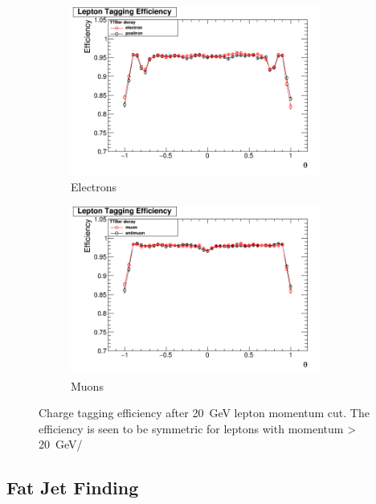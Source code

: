 \begin{figure}
  \centering
  \begin{subfigure}{.5\textwidth}
    \centering
    \includegraphics[width=0.9\textwidth]{TopAnalysis/figures/ElectronEfficiencys_20GeVCut.png}
    \caption[Charge Tagging Efficiency]{Electrons}
  \end{subfigure}%
  \begin{subfigure}{.5\textwidth}
    \centering
    \includegraphics[width=0.9\textwidth]{TopAnalysis/figures/MuonEfficiencys_20GeVMCCut.png}
    \caption[Charge Tagging Efficiency]{Muons}
  \end{subfigure}
  \caption[Charge Tagging Efficiency After 20GeV Lepton Momentum Cut]{Charge tagging efficiency after 20~GeV lepton momentum cut. The efficiency is seen to be symmetric for leptons with momentum > 20~GeV/}
  \label{fig:effienciesWithCuts}
\end{figure}


\subsection{Fat Jet Finding}

